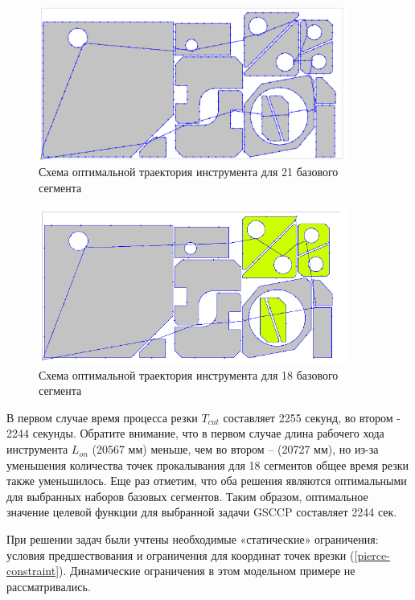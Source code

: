 \documentclass[12pt,twoside]{report}
\begin{document}
\begin{figure}
  \begin{center}
  \includegraphics[width=0.9\textwidth]{path21.png}
  \caption{Схема оптимальной траектория инструмента для 21 базового сегмента}
  \label{path21}
  \end{center}
\end{figure}

\begin{figure}
  \begin{center}
  \includegraphics[width=0.9\textwidth]{path18.png}
  \caption{Схема оптимальной траектория инструмента для 18 базового сегмента}
  \label{path18}
  \end{center}
\end{figure}

В первом случае время процесса резки
$T_{cut}$
составляет 2255 секунд,
во втором - 2244 секунды.
Обратите внимание, что в первом случае длина рабочего хода инструмента
$L_{on}$
(20567 мм) меньше, чем во втором – (20727 мм),
но из-за уменьшения количества точек прокалывания
для 18 сегментов общее время резки также уменьшилось.
Еще раз отметим, что оба решения являются оптимальными
для выбранных наборов базовых сегментов.
Таким образом, оптимальное значение целевой
функции для выбранной задачи GSCCP составляет 2244 сек.

При решении задач были учтены необходимые «статические» ограничения:
условия предшествования и ограничения для координат
точек врезки (\ref{pierce-constraint}).
Динамические ограничения в этом модельном примере не рассматривались.
\end{document}
